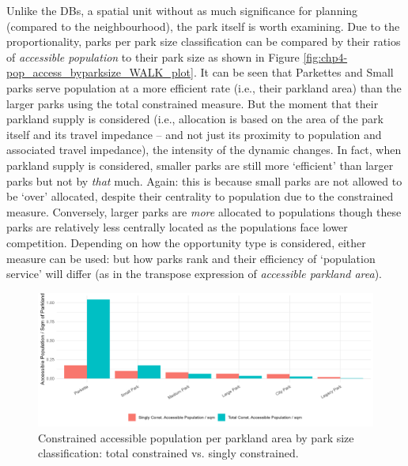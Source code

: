 \documentclass[
11pt, %
oneside, %
english, %
singlespacing, %
]{macthesis} %
\begin{document}
Unlike the DBs, a spatial unit without as much significance for planning (compared to the neighbourhood), the park itself is worth examining. Due to the proportionality, parks per park size classification can be compared by their ratios of \emph{accessible population} to their park size as shown in Figure \ref{fig:chp4-pop_access_byparksize_WALK_plot}. It can be seen that Parkettes and Small parks serve population at a more efficient rate (i.e., their parkland area) than the larger parks using the total constrained measure. But the moment that their parkland supply is considered (i.e., allocation is based on the area of the park itself and its travel impedance -- and not just its proximity to population and associated travel impedance), the intensity of the dynamic changes. In fact, when parkland supply is considered, smaller parks are still more `efficient' than larger parks but not by \emph{that} much. Again: this is because small parks are not allowed to be `over' allocated, despite their centrality to population due to the constrained measure. Conversely, larger parks are \emph{more} allocated to populations though these parks are relatively less centrally located as the populations face lower competition. Depending on how the opportunity type is considered, either measure can be used: but how parks rank and their efficiency of `population service' will differ (as in the transpose expression of \emph{accessible parkland area}).

\begin{figure}

{\centering \includegraphics[width=6in]{./data/figures/chp4-pop_access_byparksize_WALK_plot} 

}

\caption{\label{fig:chp4-pop_access_byparksize_WALK_plot}Constrained accessible population per parkland area by park size classification: total constrained vs. singly constrained.}\label{fig:unnamed-chunk-69}
\end{figure}
\end{document}
